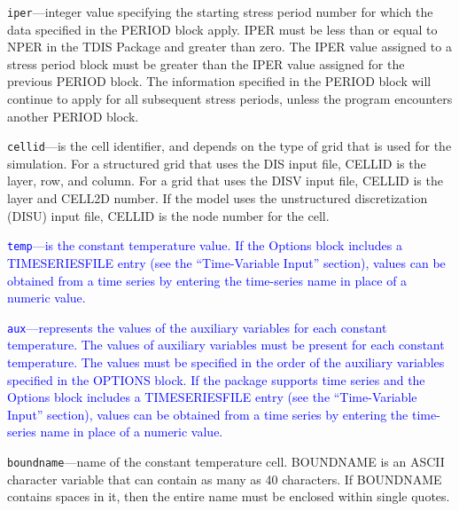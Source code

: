 \begin{description}
\item \texttt{iper}---integer value specifying the starting stress period number for which the data specified in the PERIOD block apply.  IPER must be less than or equal to NPER in the TDIS Package and greater than zero.  The IPER value assigned to a stress period block must be greater than the IPER value assigned for the previous PERIOD block.  The information specified in the PERIOD block will continue to apply for all subsequent stress periods, unless the program encounters another PERIOD block.

\item \texttt{cellid}---is the cell identifier, and depends on the type of grid that is used for the simulation.  For a structured grid that uses the DIS input file, CELLID is the layer, row, and column.   For a grid that uses the DISV input file, CELLID is the layer and CELL2D number.  If the model uses the unstructured discretization (DISU) input file, CELLID is the node number for the cell.

\item \textcolor{blue}{\texttt{temp}---is the constant temperature value. If the Options block includes a TIMESERIESFILE entry (see the ``Time-Variable Input'' section), values can be obtained from a time series by entering the time-series name in place of a numeric value.}

\item \textcolor{blue}{\texttt{aux}---represents the values of the auxiliary variables for each constant temperature. The values of auxiliary variables must be present for each constant temperature. The values must be specified in the order of the auxiliary variables specified in the OPTIONS block.  If the package supports time series and the Options block includes a TIMESERIESFILE entry (see the ``Time-Variable Input'' section), values can be obtained from a time series by entering the time-series name in place of a numeric value.}

\item \texttt{boundname}---name of the constant temperature cell.  BOUNDNAME is an ASCII character variable that can contain as many as 40 characters.  If BOUNDNAME contains spaces in it, then the entire name must be enclosed within single quotes.

\end{description}

